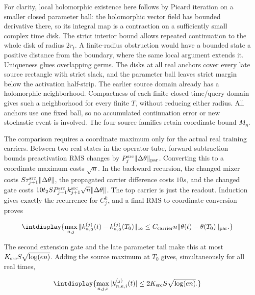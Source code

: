 For clarity, local holomorphic existence here follows by Picard iteration on a smaller closed parameter ball: the holomorphic vector field has bounded derivative there, so its integral map is a contraction on a sufficiently small complex time disk. The strict interior bound allows repeated continuation to the whole disk of radius \(2r_t\). A finite-radius obstruction would have a bounded state a positive distance from the boundary, where the same local argument extends it. Uniqueness glues overlapping germs. The disks at all real anchors cover every late source rectangle with strict slack, and the parameter ball leaves strict margin below the activation half-strip. The earlier source domain already has a holomorphic neighborhood. Compactness of each finite closed time/query domain gives such a neighborhood for every finite \(T\), without reducing either radius. All anchors use one fixed ball, so no accumulated continuation error or new stochastic event is involved. The four source families retain coordinate bound \(M_n\).



The comparison requires a coordinate maximum only for the actual real training carriers. Between two real states in the operator tube, forward subtraction bounds preactivation RMS changes by \(P_j^{\rm src}\|\Delta\theta\|_{\rm par}\). Converting this to a coordinate maximum costs \(\sqrt n\). In the backward recursion, the changed mixer costs \(S\tau_{j+1}^{\rm src}\|\Delta\theta\|\), the propagated carrier difference costs \(10s\), and the changed gate costs \(10t_2SP_{j+1}^{\rm src}k_{j+1}^{\rm src}\sqrt n\|\Delta\theta\|\). The top carrier is just the readout. Induction gives exactly the recurrence for \(C_j^k\), and a final RMS-to-coordinate conversion proves


\begingroup\renewcommand{\theHequation}{intdisplay.630}
\begin{equation*}
\intdisplay{
\max_{a,j}\|k_{n,a}^{(j)}(t)-k_{n,a}^{(j)}(T_0)\|_\infty
                  \le C_{\rm carrier}n\|\theta(t)-\theta(T_0)\|_{\rm par}.
}
\end{equation*}
\endgroup


The second extension gate and the late parameter tail make this at most \(K_{\rm src}S\sqrt{\log(en)}\). Adding the source maximum at \(T_0\) gives, simultaneously for all real times,


\begingroup\renewcommand{\theHequation}{intdisplay.631}
\begin{equation}
\intdisplay{
\max_{a,j,i}|k_{n,a,i}^{(j)}(t)|
                 \le2K_{\rm src}S\sqrt{\log(en)}.
}
\label{int:eq-0267-harmonic-all-time-carrier-bound}
\end{equation}
\endgroup

